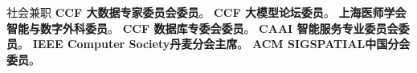 \begin{rubric}{社会兼职}
%
	\textbf{CCF 大数据专家委员会委员}。
%
	\textbf{CCF 大模型论坛委员}。
%
	\textbf{上海医师学会智能与数字外科委员}。
%
	\textbf{CCF 数据库专委会委员}。
%
	\textbf{CAAI 智能服务专业委员会委员}。
%
	\textbf{IEEE Computer Society丹麦分会主席}。
%
	\textbf{ACM SIGSPATIAL中国分会委员}。
\end{rubric}
